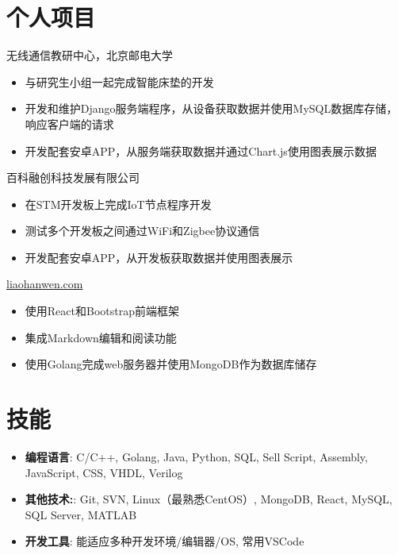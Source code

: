 \documentclass{resume}
\begin{document}
\vspace{6pt}

\section{个人项目}
无线通信教研中心，北京邮电大学
\begin{itemize}[parsep=0.25ex]
    \item 与研究生小组一起完成智能床垫的开发
    \item 开发和维护Django服务端程序，从设备获取数据并使用MySQL数据库存储，响应客户端的请求
    \item 开发配套安卓APP，从服务端获取数据并通过Chart.js使用图表展示数据
\end{itemize}
百科融创科技发展有限公司
\begin{itemize}[parsep=0.25ex]
    \item 在STM开发板上完成IoT节点程序开发
    \item 测试多个开发板之间通过WiFi和Zigbee协议通信
    \item 开发配套安卓APP，从开发板获取数据并使用图表展示
\end{itemize}
\href{https://liaohanwen.com}{liaohanwen.com}
\begin{itemize}[parsep=0.25ex]
    \item 使用React和Bootstrap前端框架
    \item 集成Markdown编辑和阅读功能
    \item 使用Golang完成web服务器并使用MongoDB作为数据库储存
\end{itemize}

\vspace{6pt}

\section{技能}
\begin{itemize}[parsep=0.25ex]
    \item
          \textbf{编程语言}:
          C/C++, Golang, Java, Python, SQL, Sell Script, Assembly, JavaScript, CSS, VHDL, Verilog
    \item
          \textbf{其他技术:}:
          Git, SVN, Linux（最熟悉CentOS）, MongoDB, React, MySQL, SQL Server, MATLAB
    \item
          \textbf{开发工具}:
          能适应多种开发环境/编辑器/OS, 常用VSCode
\end{itemize}
\end{document}
